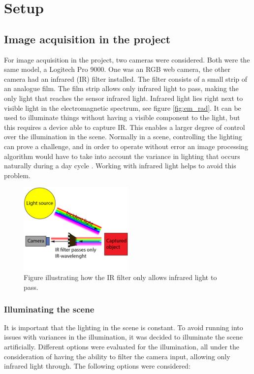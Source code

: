 \chapter{Setup}

\section{Image acquisition in the project}
For image acquisition in the project, two cameras were considered. Both were the same model, a Logitech Pro 9000. One was an RGB web camera, the other camera had an infrared (IR) filter installed. The filter consists of a small strip of an analogue film. The film strip allows only infrared light to pass, making the only light that reaches the sensor infrared light. Infrared light lies right next to visible light in the electromagnetic spectrum, see figure \ref{fig:em_rad}. It can be used to illuminate things without having a visible component to the light, but this requires a device able to capture IR. This enables a larger degree of control over the illumination in the scene. Normally in a scene, controlling the lighting can prove a challenge, and in order to operate without error an image processing algorithm would have to take into account the variance in lighting that occurs naturally during a day cycle \citep{ip_book}. Working with infrared light helps to avoid this problem.

\begin{figure}[htbp] 
\centering 
\includegraphics[width=0.5\textwidth]{Pictures/Theory/IR_filter.png} 
\caption{Figure illustrating how the IR filter only allows infrared light to pass.} 
\label{fig:ir_filter} 
\end{figure}

\subsection{Illuminating the scene}

It is important that the lighting in the scene is constant. To avoid running into issues with variances in the illumination, it was decided to illuminate the scene artificially. Different options were evaluated for the illumination, all under the consideration of having the ability to filter the camera input, allowing only infrared light through. The following options were considered:

